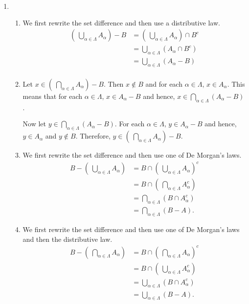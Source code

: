 \begin{enumerate}
\item \begin{enumerate}
\item We first rewrite the set difference and then use a distributive law.
\begin{align*}
\left(\:\bigcup\limits_{\alpha \in \Lambda}^{}A_{\alpha} \right) - B 
            &= \left(\:\bigcup\limits_{\alpha \in \Lambda}^{}A_{\alpha} \right) \cap B^c \\
            &= \bigcup\limits_{\alpha \in \Lambda}^{}\left( A_\alpha \cap B^c \right) \\
            &=\bigcup\limits_{\alpha \in \Lambda}^{} \left( A_{\alpha} - B \right) \\
\end{align*}

\item Let $x \in \left(\:\bigcap\limits_{\alpha \in \Lambda}^{}A_{\alpha} \right) - B$.  Then 
$x \notin B$ and for each $\alpha \in \Lambda$, $x \in A_{\alpha}$.  This means that for each 
$\alpha \in \Lambda$, $x \in A_{\alpha} - B$ and hence, 
$x \in \bigcap\limits_{\alpha \in \Lambda}^{} \left( A_{\alpha} - B \right)$.

Now let $y \in \bigcap\limits_{\alpha \in \Lambda}^{} \left( A_{\alpha} - B \right)$.  For each 
$\alpha \in \Lambda$, $y \in A_{\alpha} - B$ and hence, $y \in A_{\alpha}$ and $y \notin B$.  Therefore, $y \in \left(\:\bigcap\limits_{\alpha \in \Lambda}^{}A_{\alpha} \right) - B$.

\item We first rewrite the set difference and then use one of De Morgan's laws.
\begin{align*}
B - \left(\:\bigcup\limits_{\alpha \in \Lambda}^{}A_{\alpha} \right) &= 
B\cap \left(\:\bigcup\limits_{\alpha \in \Lambda}^{}A_{\alpha} \right)^c \\
  &= B \cap \left(\:\bigcap\limits_{\alpha \in \Lambda}^{}A_{\alpha}^c \right) \\
  &= \bigcap\limits_{\alpha \in \Lambda}^{}\left( B \cap A_{\alpha}^c \right) \\
  &= \bigcap\limits_{\alpha \in \Lambda}^{}\left( B -A \right).
\end{align*}

\item We first rewrite the set difference and then use one of De Morgan's laws and then the distributive law.
\begin{align*}
B - \left(\:\bigcap\limits_{\alpha \in \Lambda}^{}A_{\alpha} \right) &= 
B\cap \left(\:\bigcap\limits_{\alpha \in \Lambda}^{}A_{\alpha} \right)^c \\
  &= B \cap \left(\:\bigcup\limits_{\alpha \in \Lambda}^{}A_{\alpha}^c \right) \\
  &= \bigcup\limits_{\alpha \in \Lambda}^{}\left( B \cap A_{\alpha}^c \right) \\
  &= \bigcup\limits_{\alpha \in \Lambda}^{}\left( B -A \right).
\end{align*}
\end{enumerate}
\end{enumerate}



